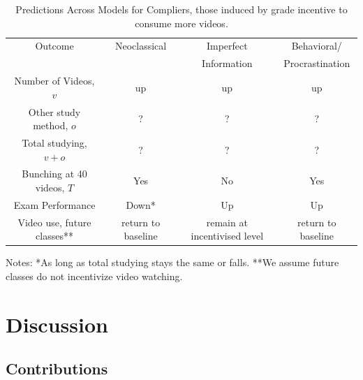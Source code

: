 \documentclass[12pt]{article}
\begin{document}
\begin{table}
	\caption{Predictions Across Models for Compliers, those induced by grade incentive to consume more videos.}
	\centering
	\begin{tabular}{ c|c|c|c }
		Outcome & Neoclassical & Imperfect& Behavioral/ \\
		& & Information & Procrastination\\
		\hline
		Number of Videos, $v$ & up & up & up \\
		Other study method, $o$ & ? & ? & ?\\
		Total studying, $v+o$ & ? & ? & ? \\
		Bunching at 40 videos, $T$ & Yes & No & Yes \\
		Exam Performance & Down* & Up & Up\\
		Video use, future classes** & return to baseline & remain at incentivised level & return to baseline \\
		\hline
	\end{tabular}
	Notes: *As long as total studying stays the same or falls. **We assume future classes do not incentivize video watching.
	\label{modelpredictions}

\end{table}



\section{Discussion} \label{discussion}

\subsection{Contributions}
\end{document}
